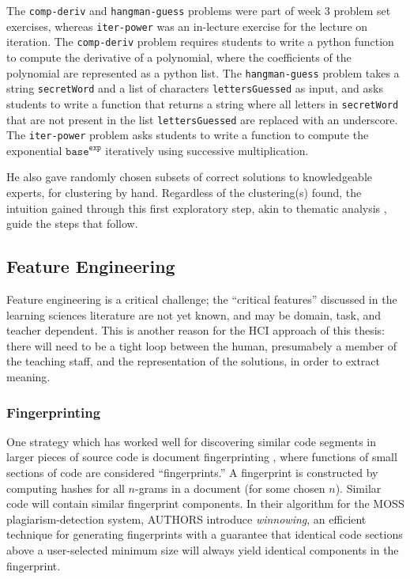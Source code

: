\documentclass[12pt]{article}
\newcommand\codevar[1]{\texttt{#1}}
\begin{document}
The \codevar{comp-deriv} and \codevar{hangman-guess} problems were part of week 3 problem set exercises, whereas \codevar{iter-power} was an in-lecture exercise for the lecture on iteration. The \codevar{comp-deriv} problem requires students to write a python function to compute the derivative of a polynomial, where the coefficients of the polynomial are represented as a python list. The \codevar{hangman-guess} problem takes a string \codevar{secretWord} and a list of characters \codevar{lettersGuessed} as input, and asks students to write a function that returns a string where all letters in \codevar{secretWord} that are not present in the list \codevar{lettersGuessed} are replaced with an underscore. The \codevar{iter-power} problem asks students to write a function to compute the exponential $\codevar{base}^\codevar{exp}$ iteratively using successive multiplication.

He also gave randomly chosen subsets of correct solutions to knowledgeable experts, for clustering by hand. Regardless of the clustering(s) found, the intuition gained through this first exploratory step, akin to thematic analysis \cite{thematic06}, guide the steps that follow.

\subsection{Feature Engineering}

Feature engineering is a critical challenge; the ``critical features'' discussed in the learning sciences literature are not yet known, and may be domain, task, and teacher dependent. This is another reason for the HCI approach of this thesis: there will need to be a tight loop between the human, presumabely a member of the teaching staff, and the representation of the solutions, in order to extract meaning.

\subsubsection{Fingerprinting}

One strategy which has worked well for discovering similar code segments in larger pieces of source code is document fingerprinting \cite{MossFolks}, where functions of small sections of code are considered ``fingerprints.'' A fingerprint is constructed by computing hashes for all $n$-grams in a document (for some chosen $n$). Similar code will contain similar fingerprint components. In their algorithm for the MOSS plagiarism-detection system, AUTHORS \cite{MossFolks} introduce \emph{winnowing}, an efficient technique for generating fingerprints with a guarantee that identical code sections above a user-selected minimum size will always yield identical components in the fingerprint.
\end{document}
